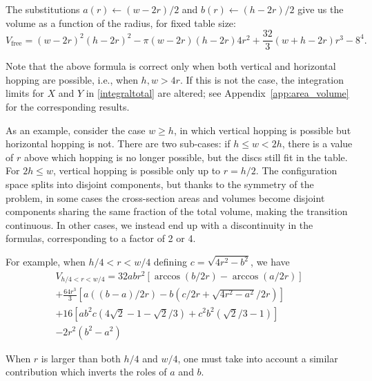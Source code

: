 \documentclass[superscriptaddress,pre,reprint,showpacs,twocolumn]{revtex4-1}
\begin{document}
The substitutions $a(r)\leftarrow (w-2r)/2$ and $b(r)\leftarrow (h-2r)/2$ give us
 the volume as a function of the radius, for fixed table size:
\begin{equation}\label{volumewhd}
 V_\text{free} 
= (w-2r)^{2} (h-2r)^{2}  - 
 \pi (w-2r)(h-2r) 4 r^{2} + 
\textstyle \frac{32}{3} (w+h-2r) r^{3}  
- 8^{4}.
\end{equation}

Note that the above formula is correct only when both
vertical and horizontal hopping are possible, i.e., when $h, w > 4r$.
If this is not the case, the 
integration limits for $X$ and $Y$ in \eqref{integraltotal} are altered; 
see Appendix~\ref{app:area_volume} for the corresponding results.

As an example, consider the case $w \geq h$, in which vertical hopping is possible
but horizontal hopping is not.
There are two sub-cases: if
$ h \leq  w < 2 h $, there is a value of $r$ above which hopping is no longer possible,
but the discs still fit in the table. For $2 h \leq w $, vertical hopping is
possible only up to $r = h/2$.
The configuration space splits into disjoint components, but 
thanks to the symmetry of
the problem, in some cases the cross-section areas and 
volumes become disjoint components sharing the same fraction of
the total volume, making the transition continuous. In other cases, we instead end up with 
a discontinuity in the formulas,
corresponding to a factor of 2 or 4. 


For example, when $h/4 < r < w/4$ 
defining 
$c = \sqrt{4r^2-b^2}$, we have
\begin{multline}\label{VolumenCasoFeo}
V_{h/4<r<w/4} = 32abr^2 \left[ \arccos(b/2r)-\arccos(a/2r) \right]\\
+\frac{64 r^3}{3 } \left[ a((b-a)/2r)-b(c/2r+\sqrt{4r^2-a^2}/2r) \right]\\
+16 \left[ a b^2 c (4\sqrt{2}-1-\sqrt{2}/3) 
  +c^2b^2 (\sqrt{2}/3-1) \right]\\
-2r^2 (b^2-a^2)
\end{multline}

When $r$ is larger than both $h/4$ and $w/4$, one must take
into account a similar
contribution which inverts the roles of $a$ and $b$.

\end{document}

